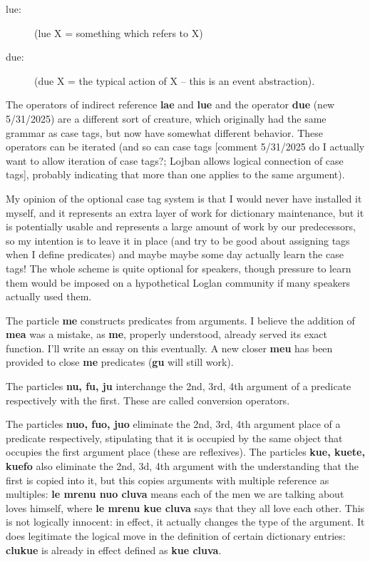 \documentclass[12pt]{book}
\begin{document}
{\begin{description}
\item[lue:] (lue X = something which refers to X)

\item [due:]  (due X = the typical action of X -- this is an event abstraction).

\end{description}  The operators of indirect reference {\bf lae} and {\bf lue} and the operator {\bf due} (new 5/31/2025) are a different sort of creature, which originally had the same grammar as case tags, but now have somewhat different behavior.   These operators can be iterated (and so can case tags [comment 5/31/2025 do I actually want to allow iteration of case tags?;  Lojban allows logical connection of case tags], probably indicating that more than one applies to the same argument).

My opinion of the optional case tag system is that I would never have installed it myself, and it represents an extra layer of work for dictionary maintenance, but it is potentially usable and represents a large amount of work by our predecessors, so my intention is to leave it in place (and try to be good about assigning tags when I define predicates) and maybe maybe some day actually learn the case tags!   The whole scheme is quite optional for speakers, though pressure to learn them would be imposed on a hypothetical Loglan community if many speakers actually used them.

The particle {\bf me} constructs predicates from arguments.   I believe the addition of {\bf mea} was a mistake, as {\bf me}, properly understood, already served its exact function.  I'll write an essay on this eventually.  A new closer {\bf meu} has been provided to close {\bf me} predicates
({\bf gu} will still work).

The particles {\bf nu, fu, ju} interchange the 2nd, 3rd, 4th argument of a predicate respectively with the first.   These are called conversion operators.

The particles {\bf nuo, fuo, juo} eliminate the 2nd, 3rd, 4th argument place of a predicate respectively, stipulating that it is occupied by the same object that occupies the first argument place
(these are reflexives).  The particles {\bf kue, kuete, kuefo} also eliminate the 2nd, 3d, 4th argument with the understanding that the first is copied into it, but this copies arguments with multiple reference as multiples:
{\bf le mrenu nuo cluva} means each of the men we are talking about loves himself, where {\bf le mrenu kue cluva} says that they all love each other.  This is not logically innocent:  in effect, it actually changes the type of the argument.  
It does legitimate the logical move in the definition of certain dictionary entries:  {\bf clukue} is already in effect defined as {\bf kue cluva}.

}
\end{document}
